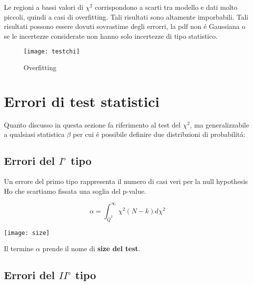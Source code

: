 \documentclass[11pt,a4paper]{book}
\begin{document}
\noindent Le regioni a bassi valori di $\chi^2$ corrispondono a scarti tra modello e dati molto piccoli, quindi a casi di overfitting. Tali risultati sono altamente imporbabili. Tali risultati possono essere dovuti sovrastime degli errorri, la pdf non \'{e} Gaussiana o se le incertezze considerate non hanno solo incertezze di tipo statistico. 

\begin{figure}[ht]
\vspace{0.1in}
\texttt{[image: testchi]}	
\centering
\caption{Overfitting}
\end{figure}
\section{Errori di test statistici}

Quanto discusso in questa sezione fa riferimento al test del $\chi^2$, ma generalizzabile a qualsiasi statistica $\beta$ per cui \'{e} possibile definire due distribzioni di probabilit\'{a}:

\subsection{Errori del $I^{\circ}$ tipo}

Un errore del primo tipo rappresenta il numero di casi veri per la null hypothesis Ho che scartiamo fissata una soglia del p-value.

\vspace{0.3in}
\begin{minipage}{.4\textwidth}
	\begin{equation}
		\alpha = \int_{\overline{Q}^2}^{\infty}\chi^2(N-k)d\chi^2 
	\end{equation}
  \end{minipage}
  \begin{minipage}{.4\textwidth}
    \centering
    \texttt{[image: size]}	
  \end{minipage}
\vspace{0.2in}

Il termine $\alpha $ prende il nome di \textbf{size del test}. 

\subsection{Errori del $II^{\circ}$ tipo}
\end{document}
